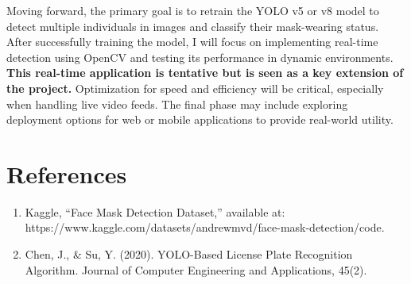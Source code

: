 \documentclass[11pt]{article}
\begin{document}
Moving forward, the primary goal is to retrain the YOLO v5 or v8 model to detect multiple individuals in images and classify their mask-wearing status. After successfully training the model, I will focus on implementing real-time detection using OpenCV and testing its performance in dynamic environments. \textbf{This real-time application is tentative but is seen as a key extension of the project.} Optimization for speed and efficiency will be critical, especially when handling live video feeds. The final phase may include exploring deployment options for web or mobile applications to provide real-world utility.

\section{References}

\begin{enumerate}
    \item Kaggle, “Face Mask Detection Dataset,” available at: \newline
    https://www.kaggle.com/datasets/andrewmvd/face-mask-detection/code.
    \item Chen, J., \& Su, Y. (2020). YOLO-Based License Plate Recognition Algorithm. Journal of Computer Engineering and Applications, 45(2).
\end{enumerate}
\end{document}

